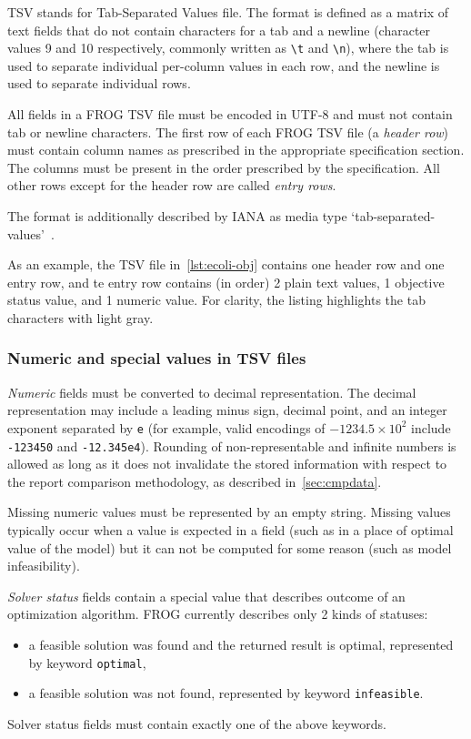 TSV stands for Tab-Separated Values file. The format is defined as a matrix of text fields that do not contain characters for a tab and a newline (character values 9 and 10 respectively, commonly written as \verb|\t| and \verb|\n|), where the tab is used to separate individual per-column values in each row, and the newline is used to separate individual rows.

All fields in a FROG TSV file must be encoded in UTF-8 and must not contain tab or newline characters. The first row of each FROG TSV file (a \emph{header row}) must contain column names as prescribed in the appropriate specification section. The columns must be present in the order prescribed by the specification. All other rows except for the header row are called \emph{entry rows}.

The format is additionally described by IANA as media type `tab-separated-values'~\cite{ianatsv}.

As an example, the TSV file in~\cref{lst:ecoli-obj} contains one header row and one entry row, and te entry row contains (in order) 2 plain text values, 1 objective status value, and 1 numeric value. For clarity, the listing highlights the tab characters with light gray.

\subsubsection{Numeric and special values in TSV files}
\emph{Numeric} fields must be converted to decimal representation. The decimal representation may include a leading minus sign, decimal point, and an integer exponent separated by \verb|e| (for example, valid encodings of $-1234.5\times10^2$ include \verb|-123450| and \verb|-12.345e4|). Rounding of non-representable and infinite numbers is allowed as long as it does not invalidate the stored information with respect to the report comparison methodology, as described in~\cref{sec:cmpdata}.

Missing numeric values must be represented by an empty string. Missing values typically occur when a value is expected in a field (such as in a place of optimal value of the model) but it can not be computed for some reason (such as model infeasibility).

\emph{Solver status} fields contain a special value that describes outcome of an optimization algorithm. FROG currently describes only 2 kinds of statuses:
\begin{itemize}
\item a feasible solution was found and the returned result is optimal, represented by keyword \verb|optimal|,
\item a feasible solution was not found, represented by keyword \verb|infeasible|.
\end{itemize}
Solver status fields must contain exactly one of the above keywords.

